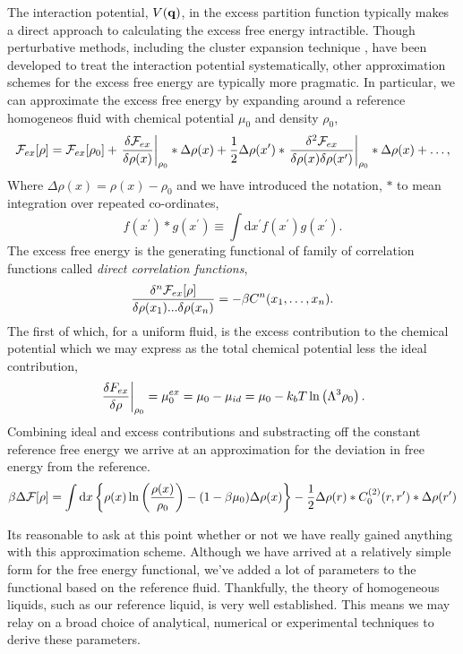 The interaction potential, $V(\mathbf{q})$, in the excess partition function typically makes a direct approach to calculating the excess free energy intractible.
Though perturbative methods, including the cluster expansion technique \cite{MAYER41}, have been developed to treat the interaction potential systematically, other approximation schemes for the excess free energy are typically more pragmatic.
In particular, we can approximate the excess free energy by expanding around a reference homogeneos fluid with chemical potential $\mu_0$ and density $\rho_0$,
%
\begin{equation}
    \mathcal{F}_{ex}[\rho] = \mathcal{F}_{ex}[\rho_0] 
        + \left . \frac{\delta \mathcal{F}_{ex}}{\delta \rho(x)} \right\vert_{\rho_0} \ast \Delta\rho(x) 
        + \frac{1}{2} \Delta\rho(x^\prime) \ast 
            \left . \frac{\delta^2 \mathcal{F}_{ex}}{\delta\rho(x)\delta\rho(x^\prime)} \right\vert_{\rho_0} 
            \ast \Delta\rho(x) + \dots,
\end{equation}
%
Where $\Delta\rho(x) = \rho(x) - \rho_0$ and we have introduced the notation, $\ast$ to mean integration over repeated co-ordinates,
%
\begin{equation}
    f(x^\prime) \ast g(x^\prime) \equiv \int\mathrm{d}x^\prime f(x^\prime) g(x^\prime).
\end{equation}
%
The excess free energy is the generating functional of family of correlation functions called \textit{direct correlation functions}, 
%
\begin{equation}
    \frac{\delta^n \mathcal{F}_{ex}[\rho]}{\delta \rho(x_1) ... \delta \rho(x_n)} = -\beta C^{n}(x_1, \dots, x_n).
\end{equation}
%
The first of which, for a uniform fluid, is the excess contribution to the chemical potential which we may express as the total chemical potential less the ideal contribution, 
%
\begin{equation}
    \left.\frac{\delta F_{ex}}{\delta \rho}\right\vert_{\rho_0} = \mu_0^{ex} = \mu_0 - \mu_{id} = \mu_0 - k_bT\ln\left(\Lambda^3 \rho_0\right).
\end{equation}
%
Combining ideal and excess contributions and substracting off the constant reference free energy we arrive at an approximation for the deviation in free energy from the reference. 
%
\begin{equation}
    \beta \Delta \mathcal{F} [\rho] = 
        \int \mathrm{d}x \left\lbrace \rho(x) \ln\left(\frac{\rho(x)}{\rho_0} \right) -(1-\beta\mu_0) \Delta \rho(x)\right\rbrace
        - \frac{1}{2}\Delta \rho(r) \ast C_0^{(2)}(r, r^\prime) \ast \Delta \rho(r^\prime)
\end{equation}

Its reasonable to ask at this point whether or not we have really gained anything with this approximation scheme.
Although we have arrived at a relatively simple form for the free energy functional, we've added a lot of parameters to the functional based on the reference fluid.
Thankfully, the theory of homogeneous liquids, such as our reference liquid, is very well established.
This means we may relay on a broad choice of analytical, numerical or experimental techniques to derive these parameters.
